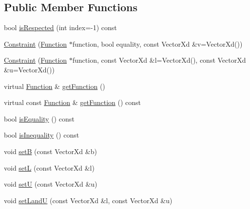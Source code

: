 \subsection*{Public Member Functions}
\begin{DoxyCompactItemize}
\item 
bool \hyperlink{classocra_1_1Constraint_3_01Function_01_4_a8406632b9e28804d9d8848a8e71ccbd8}{is\+Respected} (int index=-\/1) const
\end{DoxyCompactItemize}
{\bf }\par
\begin{DoxyCompactItemize}
\item 
\hyperlink{classocra_1_1Constraint_3_01Function_01_4_aefef89fd502e8f1fed23be307f71b508}{Constraint} (\hyperlink{classocra_1_1Function}{Function} $\ast$function, bool equality, const Vector\+Xd \&v=Vector\+Xd())
\item 
\hyperlink{classocra_1_1Constraint_3_01Function_01_4_a9b8a02fdfb62c2d3d774552baccd268b}{Constraint} (\hyperlink{classocra_1_1Function}{Function} $\ast$function, const Vector\+Xd \&l=Vector\+Xd(), const Vector\+Xd \&u=Vector\+Xd())
\end{DoxyCompactItemize}

{\bf }\par
\begin{DoxyCompactItemize}
\item 
virtual \hyperlink{classocra_1_1Function}{Function} \& \hyperlink{classocra_1_1Constraint_3_01Function_01_4_a81f1d8de34c0a123bc77d4798619fe9b}{get\+Function} ()
\item 
virtual const \hyperlink{classocra_1_1Function}{Function} \& \hyperlink{classocra_1_1Constraint_3_01Function_01_4_ad7f2ac6dfb90ed0231cc3e73ef592581}{get\+Function} () const
\end{DoxyCompactItemize}

{\bf }\par
\begin{DoxyCompactItemize}
\item 
bool \hyperlink{classocra_1_1Constraint_3_01Function_01_4_a3c7d085d888ef8937977129740d4c8a6}{is\+Equality} () const
\item 
bool \hyperlink{classocra_1_1Constraint_3_01Function_01_4_ab9083572de0c38297a7c20d88b82e183}{is\+Inequality} () const
\end{DoxyCompactItemize}

{\bf }\par
\begin{DoxyCompactItemize}
\item 
void \hyperlink{classocra_1_1Constraint_3_01Function_01_4_a14893e8b8e01e60f0369ef6c934ca6ab}{setB} (const Vector\+Xd \&b)
\item 
void \hyperlink{classocra_1_1Constraint_3_01Function_01_4_a9bfbc2cff3d9ad7099f8f51228b541c4}{setL} (const Vector\+Xd \&l)
\item 
void \hyperlink{classocra_1_1Constraint_3_01Function_01_4_a80c1536eb85f6913a8d80a36456aa90a}{setU} (const Vector\+Xd \&u)
\item 
void \hyperlink{classocra_1_1Constraint_3_01Function_01_4_adbf50d4faf459c8e6469937b0501b5e2}{set\+LandU} (const Vector\+Xd \&l, const Vector\+Xd \&u)
\end{DoxyCompactItemize}

